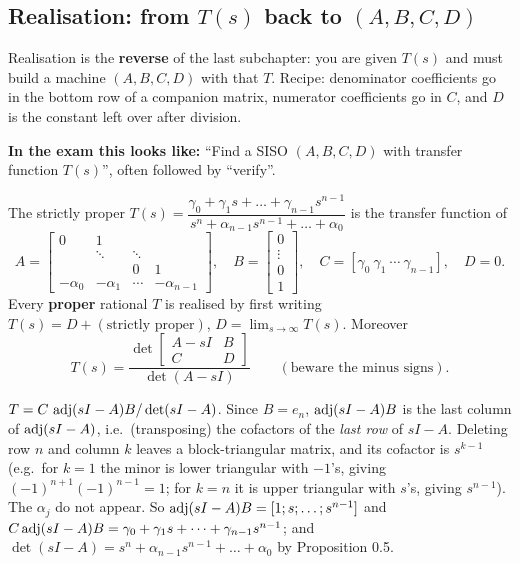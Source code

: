 \subsection{Realisation: from \texorpdfstring{$T(s)$}{T(s)} back to \texorpdfstring{$(A,B,C,D)$}{(A,B,C,D)} \texorpdfstring{}{}}\label{sec:realise}\label{ss:2-10}
\begin{plainbox}
Realisation is the \textbf{reverse} of the last subchapter: you are given $T(s)$ and must build a machine $(A,B,C,D)$ with that $T$.
Recipe: denominator coefficients go in the bottom row of a companion matrix, numerator coefficients go in $C$, and $D$ is the
constant left over after division.
\par\smallskip\textbf{In the exam this looks like:} ``Find a SISO $(A,B,C,D)$ with transfer function $T(s)$'', often followed by ``verify''.
\end{plainbox}
\begin{thmbox}[title={Proposition 0.22 (companion realisation) and Theorem 0.23}]
The strictly proper $T(s)=\dfrac{\gamma_0+\gamma_1s+\dots+\gamma_{n-1}s^{n-1}}{s^n+\alpha_{n-1}s^{n-1}+\dots+\alpha_0}$ is the transfer function of
\[A=\begin{bmatrix}0&1&&\\&\ddots&\ddots&\\&&0&1\\-\alpha_0&-\alpha_1&\cdots&-\alpha_{n-1}\end{bmatrix},\quad B=\begin{bmatrix}0\\\vdots\\0\\1\end{bmatrix},\quad C=[\gamma_0\ \gamma_1\ \cdots\ \gamma_{n-1}],\quad D=0.\]
Every \textbf{proper} rational $T$ is realised by first writing $T(s)=D+(\text{strictly proper})$, $D=\lim_{s\to\infty}T(s)$. Moreover
\[T(s)=\frac{\det\begin{bmatrix}A-sI&B\\C&D\end{bmatrix}}{\det(A-sI)}\qquad(\text{beware the minus signs}).\]
\end{thmbox}
\begin{proofbox}[title={Proof of Proposition 0.22 (sketch you can write)}]
$T=C\,\operatorname{adj}(sI-A)B/\det(sI-A)$. Since $B=e_n$, $\operatorname{adj}(sI-A)B$ is the last column of $\operatorname{adj}(sI-A)$, i.e.\ (transposing) the cofactors of the \emph{last row} of $sI-A$.
Deleting row $n$ and column $k$ leaves a block-triangular matrix, and its cofactor is $s^{k-1}$ (e.g.\ for $k=1$ the minor is lower triangular with $-1$'s, giving $(-1)^{n+1}(-1)^{n-1}=1$;
for $k=n$ it is upper triangular with $s$'s, giving $s^{n-1}$). The $\alpha_j$ do not appear. So $\operatorname{adj}(sI-A)B=[1;s;\dots;s^{n-1}]$ and
$C\operatorname{adj}(sI-A)B=\gamma_0+\gamma_1s+\dots+\gamma_{n-1}s^{n-1}$; and $\det(sI-A)=s^n+\alpha_{n-1}s^{n-1}+\dots+\alpha_0$ by Proposition 0.5.
\end{proofbox}
